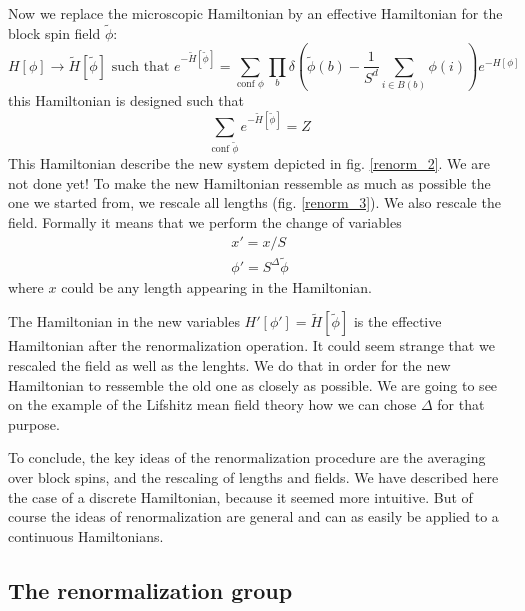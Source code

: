 Now we replace the microscopic Hamiltonian by an effective Hamiltonian for the block spin field $\tilde{\phi}$:
\begin{equation}
H[\phi] \rightarrow \tilde{H}[\tilde{\phi}] \text{ such that } e^{-\tilde{H}[\tilde{\phi}]} = \sum_{\text{conf } \phi} \prod_{b} \delta \left( \tilde{\phi}(b) - \frac{1}{S^d} \sum_{i \in B(b)} \phi(i) \right) e^{-H[\phi]}
\end{equation}
this Hamiltonian is designed such that
\begin{equation}
\sum_{\text{conf } \tilde{\phi}} e^{-\tilde{H}[\tilde{\phi}]} = Z
\end{equation}
This Hamiltonian describe the new system depicted in fig. \ref{renorm_2}. 
We are not done yet! To make the new Hamiltonian ressemble as much as possible the one we started from, we rescale all lengths (fig. \ref{renorm_3}). We also rescale the field. Formally it means that we perform the change of variables
\begin{eqnarray}
x' = x/S  \\
\phi' = S^\Delta \tilde{\phi}
\end{eqnarray}
where $x$ could be any length appearing in the Hamiltonian.

The Hamiltonian in the new variables $H'[\phi'] = \tilde{H}[\tilde{\phi}]$ is the effective Hamiltonian after the renormalization operation.  
It could seem strange that we rescaled the field as well as the lenghts. We do that in order for the new Hamiltonian to ressemble the old one as closely as possible. We are going to see on the example of the Lifshitz mean field theory how we can chose $\Delta$ for that purpose.

To conclude, the key ideas of the renormalization procedure are the averaging over block spins, and the rescaling of lengths and fields. We have described here the case of a discrete Hamiltonian, because it seemed more intuitive. But of course the ideas of renormalization are general and can as easily be applied to a continuous Hamiltonians.

\subsection{The renormalization group}

